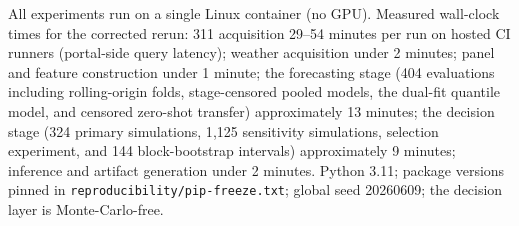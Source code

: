 All experiments run on a single Linux container (no GPU). Measured
wall-clock times for the corrected rerun: 311 acquisition 29--54 minutes
per run on hosted CI runners (portal-side query latency); weather
acquisition under 2 minutes; panel and feature construction under 1
minute; the forecasting stage (404 evaluations including rolling-origin
folds, stage-censored pooled models, the dual-fit quantile model, and
censored zero-shot transfer) approximately 13 minutes; the decision stage
(324 primary simulations, 1{,}125 sensitivity simulations, selection
experiment, and 144 block-bootstrap intervals) approximately 9 minutes;
inference and artifact generation under 2 minutes. Python 3.11; package
versions pinned in \texttt{reproducibility/pip-freeze.txt}; global seed
20260609; the decision layer is Monte-Carlo-free.
